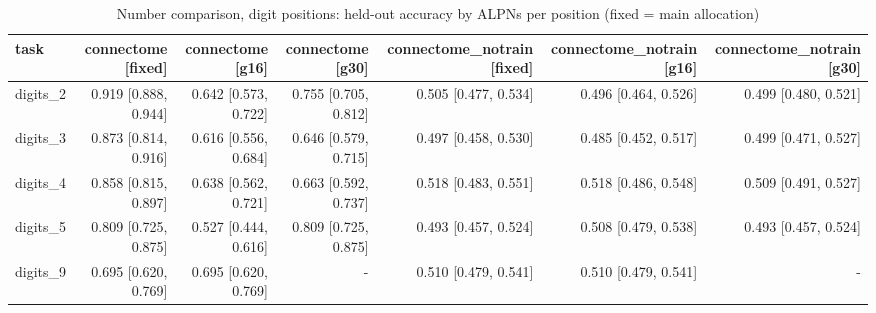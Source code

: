 \begin{table}[t]
\centering
\small
\begin{tabular}{lrrrrrr}
\toprule
task & connectome [fixed] & connectome [g16] & connectome [g30] & connectome\_notrain [fixed] & connectome\_notrain [g16] & connectome\_notrain [g30] \\
\midrule
digits\_2 & 0.919 [0.888, 0.944] & 0.642 [0.573, 0.722] & 0.755 [0.705, 0.812] & 0.505 [0.477, 0.534] & 0.496 [0.464, 0.526] & 0.499 [0.480, 0.521] \\
digits\_3 & 0.873 [0.814, 0.916] & 0.616 [0.556, 0.684] & 0.646 [0.579, 0.715] & 0.497 [0.458, 0.530] & 0.485 [0.452, 0.517] & 0.499 [0.471, 0.527] \\
digits\_4 & 0.858 [0.815, 0.897] & 0.638 [0.562, 0.721] & 0.663 [0.592, 0.737] & 0.518 [0.483, 0.551] & 0.518 [0.486, 0.548] & 0.509 [0.491, 0.527] \\
digits\_5 & 0.809 [0.725, 0.875] & 0.527 [0.444, 0.616] & 0.809 [0.725, 0.875] & 0.493 [0.457, 0.524] & 0.508 [0.479, 0.538] & 0.493 [0.457, 0.524] \\
digits\_9 & 0.695 [0.620, 0.769] & 0.695 [0.620, 0.769] & - & 0.510 [0.479, 0.541] & 0.510 [0.479, 0.541] & - \\
\bottomrule
\end{tabular}
\caption{Number comparison, digit positions: held-out accuracy by ALPNs per position (fixed = main allocation)}
\label{tab:capacity_final_acc}
\end{table}